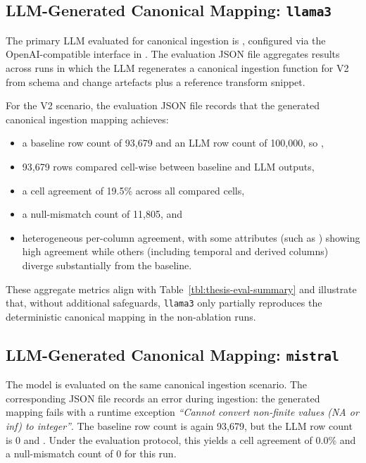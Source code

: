 \subsection{LLM-Generated Canonical Mapping: \texttt{llama3}}
\label{sec:results-canonical-llama3}

The primary LLM evaluated for canonical ingestion is , configured via the OpenAI-compatible interface in . The evaluation JSON file  aggregates results across runs in which the LLM regenerates a canonical ingestion function for V2 from schema and change artefacts plus a reference transform snippet.

For the V2 scenario, the evaluation JSON file  records that the generated canonical ingestion mapping achieves:
%
\begin{itemize}
  \item a baseline row count of 93{,}679 and an LLM row count of 100{,}000, so ,
  \item 93{,}679 rows compared cell-wise between baseline and LLM outputs,
  \item a cell agreement of 19.5\% across all compared cells,
  \item a null-mismatch count of 11{,}805, and
  \item heterogeneous per-column agreement, with some attributes (such as ) showing high agreement while others (including temporal and derived columns) diverge substantially from the baseline.
\end{itemize}

These aggregate metrics align with Table~\ref{tbl:thesis-eval-summary} and illustrate that, without additional safeguards, \texttt{llama3} only partially reproduces the deterministic canonical mapping in the non-ablation runs.

\subsection{LLM-Generated Canonical Mapping: \texttt{mistral}}
\label{sec:results-canonical-mistral}

The  model is evaluated on the same canonical ingestion scenario. The corresponding JSON file  records an error during ingestion: the generated mapping fails with a runtime exception \emph{``Cannot convert non-finite values (NA or inf) to integer''}. The baseline row count is again 93{,}679, but the LLM row count is 0 and . Under the evaluation protocol, this yields a cell agreement of 0.0\% and a null-mismatch count of 0 for this run.

